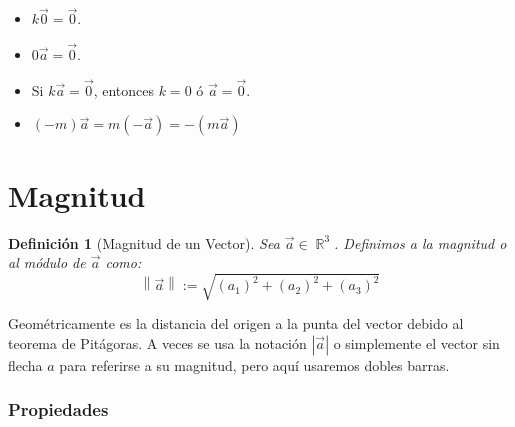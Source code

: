 \documentclass[12pt, fleqn]{report}                             %
\newenvironment{SmallIndentation}[1][0.75em]                    %
        {\begin{adjustwidth}{#1}{}\begin{footnotesize}}             %
        {\end{footnotesize}\end{adjustwidth}}                       %
\newtheorem{Definition}{Definición}[section]                    %
\theoremstyle{break}                                            %
\DeclareMathOperator \Reals        {\mathbb{R}}                 %
\newcommand{\abs}[1]{\left\lvert #1 \right\lvert}               %
\newcommand{\Abs}[1]{\left\lVert #1 \right\lVert}               %
\begin{document}
\begin{itemize}
\begin{SmallIndentation}[1em]
                    \end{SmallIndentation}


                    \item $k\vec{0} = \vec{0}$.
                    
                    \item $0\vec{a} = \vec{0}$.
                    
                    \item Si $k\vec{a} = \vec{0}$, entonces $k = 0$ ó $\vec{a} = \vec{0}$.
                    
                    \item $(-m)\vec{a} = m(-\vec{a}) = -(m\vec{a})$


                \end{itemize}
            



        \clearpage
        \section{Magnitud}
        
            \begin{Definition}[Magnitud de un Vector]
                Sea $\vec{a} \in \Reals^3$. Definimos a la magnitud o al módulo de $\vec{a}$ como:
                \begin{equation}
                    \Abs{\vec{a}} := \sqrt{(a_1)^2 + (a_2)^2 + (a_3)^2}
                \end{equation}
            \end{Definition}

    
            Geométricamente es la distancia del origen a la punta del vector debido al teorema
            de Pitágoras. A veces se usa la notación $\abs{\vec{a}}$ o simplemente el vector
            sin flecha $a$ para referirse a su magnitud, pero aquí usaremos dobles barras.
        

            \vspace{2em}
            \subsubsection{Propiedades}
\end{document}
